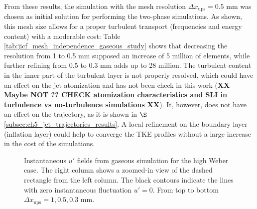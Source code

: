 From these results, the simulation with the mesh resolution $\Delta x_\mathrm{ups} = 0.5$ mm was chosen as initial solution for performing the two-phase simulations. As shown, this mesh size allows for a proper turbulent transport (frequencies and energy content) with a moderable cost: Table \ref{tab:jicf_mesh_independence_gaseous_study} shows that decreasing the resolution from 1 to 0.5 mm supposed an increase of 5 million of elements, while further refining from 0.5 to 0.3 mm adds up to 28 million. The turbulent content in the inner part of the turbulent layer is not properly resolved, which could have an effect on the jet atomization and has not been check in this work (\textbf{XX Maybe NOT ?? CHECK atomization characteristics and SLI in turbulence vs no-turbulence simulations XX}). It, however, does not have an effect on the trajectory, as it is shown in $\S$\ref{subsec:ch5_jet_trajectories_results}. A local refinement on the boundary layer (inflation layer) could help to converge the TKE profiles without a large increase in the cost of the simulations.



\begin{figure}[ht]
\centering
{}
\caption[Instantaneous $u'$ fields from gaseous simulation for the high Weber case]{Instantaneous $u'$ fields from gaseous simulation for the high Weber case. The right column shows a zoomed-in view of the dashed rectangle from the left column. The black contours indicate the lines with zero instantaneous fluctuation $u' = 0$. From top to bottom $\Delta x_\mathrm{ups} = 1, 0.5, 0.3$ mm.}
\label{fig:ics_mesh_independency_study_up_fields}
\end{figure}


\clearpage

